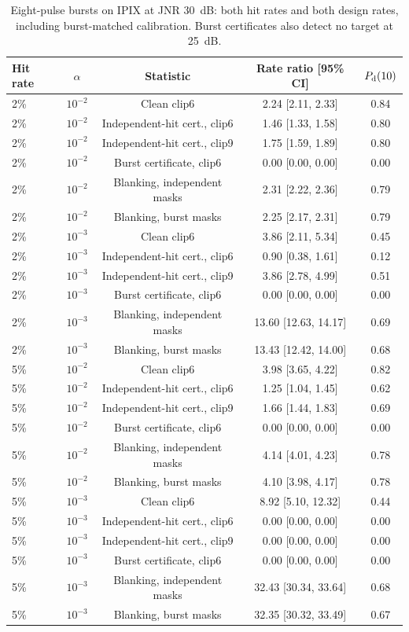 \documentclass[10pt]{article}
\begin{document}
\begin{table}[htbp]
\centering\small\setlength{\tabcolsep}{4pt}
\caption{Eight-pulse bursts on IPIX at JNR 30~dB: both hit rates and both design rates, including burst-matched calibration. Burst certificates also detect no target at 25~dB.}\label{tab:bursts}
\begin{tabular}{lcccc}
\toprule
Hit rate & $\alpha$ & Statistic & Rate ratio [95\% CI] & $P_{\rm d}(10)$ \\
\midrule
2\% & $10^{-2}$ & Clean clip6 & 2.24 [2.11, 2.33] & 0.84 \\
2\% & $10^{-2}$ & Independent-hit cert., clip6 & 1.46 [1.33, 1.58] & 0.80 \\
2\% & $10^{-2}$ & Independent-hit cert., clip9 & 1.75 [1.59, 1.89] & 0.80 \\
2\% & $10^{-2}$ & Burst certificate, clip6 & 0.00 [0.00, 0.00] & 0.00 \\
2\% & $10^{-2}$ & Blanking, independent masks & 2.31 [2.22, 2.36] & 0.79 \\
2\% & $10^{-2}$ & Blanking, burst masks & 2.25 [2.17, 2.31] & 0.79 \\
2\% & $10^{-3}$ & Clean clip6 & 3.86 [2.11, 5.34] & 0.45 \\
2\% & $10^{-3}$ & Independent-hit cert., clip6 & 0.90 [0.38, 1.61] & 0.12 \\
2\% & $10^{-3}$ & Independent-hit cert., clip9 & 3.86 [2.78, 4.99] & 0.51 \\
2\% & $10^{-3}$ & Burst certificate, clip6 & 0.00 [0.00, 0.00] & 0.00 \\
2\% & $10^{-3}$ & Blanking, independent masks & 13.60 [12.63, 14.17] & 0.69 \\
2\% & $10^{-3}$ & Blanking, burst masks & 13.43 [12.42, 14.00] & 0.68 \\
5\% & $10^{-2}$ & Clean clip6 & 3.98 [3.65, 4.22] & 0.82 \\
5\% & $10^{-2}$ & Independent-hit cert., clip6 & 1.25 [1.04, 1.45] & 0.62 \\
5\% & $10^{-2}$ & Independent-hit cert., clip9 & 1.66 [1.44, 1.83] & 0.69 \\
5\% & $10^{-2}$ & Burst certificate, clip6 & 0.00 [0.00, 0.00] & 0.00 \\
5\% & $10^{-2}$ & Blanking, independent masks & 4.14 [4.01, 4.23] & 0.78 \\
5\% & $10^{-2}$ & Blanking, burst masks & 4.10 [3.98, 4.17] & 0.78 \\
5\% & $10^{-3}$ & Clean clip6 & 8.92 [5.10, 12.32] & 0.44 \\
5\% & $10^{-3}$ & Independent-hit cert., clip6 & 0.00 [0.00, 0.00] & 0.00 \\
5\% & $10^{-3}$ & Independent-hit cert., clip9 & 0.00 [0.00, 0.00] & 0.00 \\
5\% & $10^{-3}$ & Burst certificate, clip6 & 0.00 [0.00, 0.00] & 0.00 \\
5\% & $10^{-3}$ & Blanking, independent masks & 32.43 [30.34, 33.64] & 0.68 \\
5\% & $10^{-3}$ & Blanking, burst masks & 32.35 [30.32, 33.49] & 0.67 \\
\bottomrule
\end{tabular}
\end{table}
\end{document}
